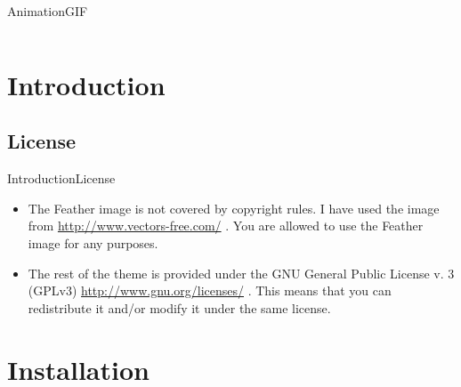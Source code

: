 \documentclass[10pt]{beamer}
\newcommand{\chref}[2]{
  \href{#1}{{\usebeamercolor[bg]{Feather}#2}}
}
\begin{document}
\begin{frame}{Animation}{GIF}
\begin{columns}
\begin{column}{6cm}
\begin{animateinline}[poster=first,controls]{8}
{%
   }%
\end{animateinline}
\end{column}\end{columns}
\end{frame}



\section{Introduction}
\subsection{License}
\begin{frame}{Introduction}{License}

  \begin{itemize}
    \item<1-> The Feather image is not covered by copyright rules. I have used the image from \chref{http://www.vectors-free.com/}{http://www.vectors-free.com/}. You are allowed to use the Feather image for any purposes.
    \item<2-> The rest of the theme is provided under the GNU General Public License v. 3 (GPLv3) \chref{http://www.gnu.org/licenses/}{http://www.gnu.org/licenses/}. This means that you can redistribute it and/or modify it under the same license. 
  \end{itemize}
\end{frame}

\section{Installation}
\end{document}
